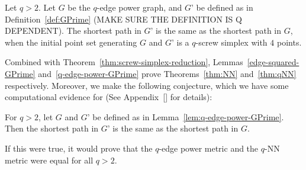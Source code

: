 \begin{lemma}\label{lem:q-edge-power-GPrime} Let $q > 2$. Let $G$ be the
$q$-edge power graph, and $G’$ be defined as in Definition~\ref{def:GPrime}
(MAKE SURE THE DEFINITION IS Q DEPENDENT). The shortest path in $G’$ is the
same as the shortest path in $G$, when the initial point set generating $G$
and $G’$ is a $q$-screw simplex with $4$ points.

\end{lemma}

Combined with Theorem~\ref{thm:screw-simplex-reduction},
Lemmas~\ref{edge-squared-GPrime} and~\ref{q-edge-power-GPrime} prove
Theorems~\ref{thm:NN} and~\ref{thm:qNN} respectively. Moreover, we make the
following conjecture, which we have some computational evidence for (See
Appendix~\ref{} for details):

\begin{conjecture}\label{conj:qNN}

For $q>2$, let $G$ and $G’$ be defined as in
Lemma~\ref{lem:q-edge-power-GPrime}. Then the shortest path in $G’$ is the same
as the shortest path in $G$.

\end{conjecture}

If this were true, it would prove that the $q$-edge power metric and the
$q$-NN metric were equal for all $q>2$.
